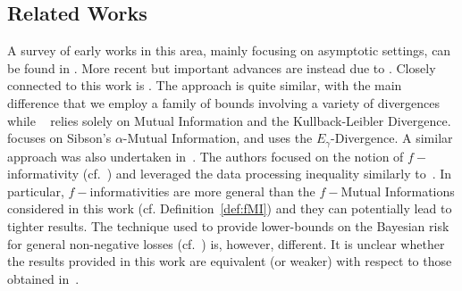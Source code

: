 \documentclass[conference]{IEEEtran}
\theoremstyle{plain}
\theoremstyle{definition}
\theoremstyle{remark}
\begin{document}
\subsection{Related
Works} A survey of early works in this area, mainly focusing on asymptotic settings, can be found in \cite{han}. More recent but important advances are instead due to \cite{zhang, nipsHideAndSeek}.
Closely connected to this work is \cite{bayesRiskRaginsky}. The approach is quite similar, with the main difference that we employ a family of bounds involving a variety of divergences while ~\cite{bayesRiskRaginsky} relies solely on Mutual Information and the Kullback-Leibler Divergence.~\cite{bayesRiskIalpha} focuses on Sibson's $\alpha$-Mutual Information, and \cite{CalmonSDPIHockeyStick} uses the $E_\gamma$-Divergence. A similar approach was also undertaken in~\cite{bayesRiskFInformativity}. The authors focused on the notion of $f-$informativity (cf.~\cite{fInformativity}) and leveraged the data processing inequality similarly to~\cite[Theorem 3]{fullVersionGeneralization}. In particular, $f-$informativities are more general than the $f-$Mutual Informations considered in this work (cf. Definition~\ref{def:fMI}) and they can potentially lead to tighter results. The technique used to provide lower-bounds on the Bayesian risk for general non-negative losses (cf.~\cite[Section 4]{bayesRiskFInformativity}) is, however, different. It is unclear whether the results provided in this work are equivalent (or weaker) with respect to those obtained in~\cite{bayesRiskFInformativity}. 
\end{document}
